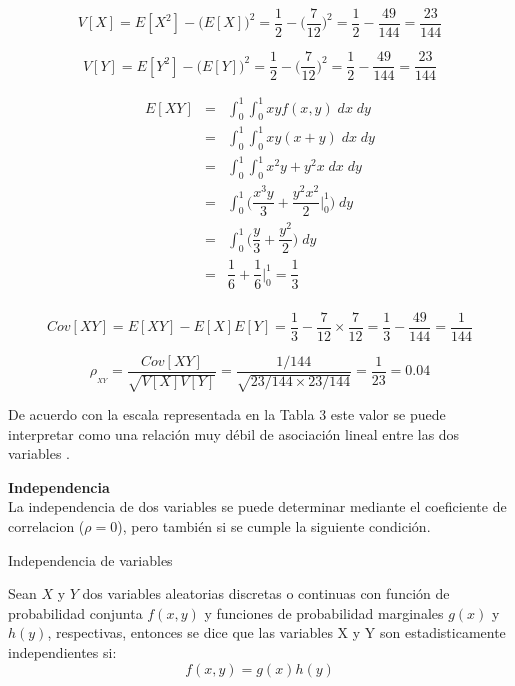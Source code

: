 \documentclass[base=hide,12pt]{elegantbook}
\begin{document}
$$V[X] = E[X^{2}]-\Big(E[X]\Big)^{2}= \dfrac{1}{2}-\Big(\dfrac{7}{12} \Big)^{2} = \dfrac{1}{2}- \dfrac{49}{144} = \dfrac{23}{144} $$

$$V[Y] = E[Y^{2}]-\Big(E[Y]\Big)^{2}= \dfrac{1}{2}-\Big(\dfrac{7}{12} \Big)^{2} = \dfrac{1}{2}- \dfrac{49}{144} = \dfrac{23}{144} $$

\begin{eqnarray*}
	E[XY] &=& \int_{0}^{1} \int_{0}^{1} xy f(x,y) \;dx \;dy \\
	&=& \int_{0}^{1} \int_{0}^{1} xy (x+y) \;dx \;dy  \\
	&=& \int_{0}^{1} \int_{0}^{1} x^{2}y+y^{2}x \;dx \;dy\\
	&=& \int_{0}^{1} \Bigg(\dfrac{x^{3}y}{3}+\dfrac{y^{2}x^{2}}{2} \Big|_{0}^{1}\Bigg) \;dy\\
	&=&  \int_{0}^{1} \Bigg( \dfrac{y}{3}+\dfrac{y^{2}}{2}\Bigg) \;dy \\
	&=& \dfrac{1}{6}+\dfrac{1}{6} \Big|_{0}^{1} =  \dfrac{1}{3}\\ 
\end{eqnarray*}


$$Cov[XY] = E[XY]-E[X]E[Y] = \dfrac{1}{3} -\dfrac{7}{12}\times  \dfrac{7}{12} = \dfrac{1}{3}- \dfrac{49}{144} = \dfrac{1}{144}$$

$$	\rho_{_{XY}} = \dfrac{Cov[XY]}{\sqrt{V[X]V[Y]}} = \dfrac{1/144}{\sqrt{23/144 \times 23/144}} = \dfrac{1}{23} = 0.04$$

De acuerdo con la escala representada en la Tabla 3  este valor se puede interpretar como una relación muy débil de asociación lineal entre las dos variables .\\

\vspace{1cm}

\textcolor{col4}{\bf \large Independencia}	\\		

La independencia de dos variables se puede determinar  mediante el coeficiente de correlacion ($\rho =0$), pero también si se cumple la siguiente condición.

\begin{Box4}{Independencia de variables}
	
Sean $X$ y $Y$ dos variables aleatorias discretas o continuas con función de probabilidad conjunta $f(x,y)$ y funciones de probabilidad marginales $g(x)$ y $h(y)$, respectivas, entonces se dice que las variables X y Y son estadisticamente independientes si:
$$f(x,y)= g(x) h(y) $$
\end{Box4}	
\end{document}

